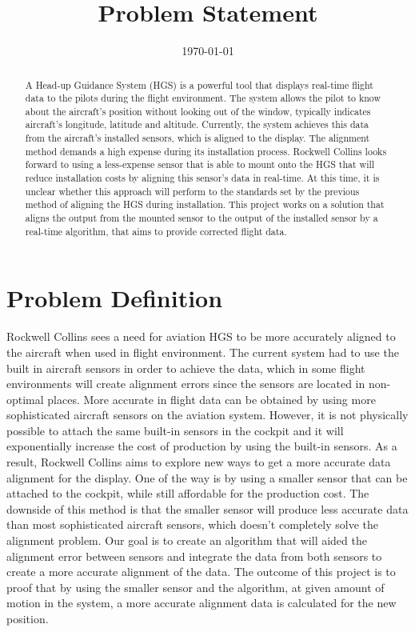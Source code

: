 \documentclass[letterpaper,10pt,titlepage]{article}
\title{\Large{Problem Statement}}
\author{\name}
\date{\today}
\begin{document}
\maketitle


\begin{abstract}
A Head-up Guidance System (HGS) is a powerful tool that displays real-time flight data to the pilots during the flight environment. The system allows the pilot to know about the aircraft’s position without looking out of the window, typically indicates aircraft’s longitude, latitude and altitude. Currently, the system achieves this data from the aircraft’s installed sensors, which is aligned to the display. The alignment method demands a high expense during its installation process. Rockwell Collins looks forward to using a less-expense sensor that is able to mount onto the HGS that will reduce installation costs by aligning this sensor’s data in real-time. At this time, it is unclear whether this approach will perform to the standards set by the previous method of aligning the HGS during installation. This project works on a solution that aligns the output from the mounted sensor to the output of the installed sensor by a real-time algorithm, that aims to provide corrected flight data. 

\end{abstract}

\section*{Problem Definition}
Rockwell Collins sees a need for aviation HGS to be more accurately aligned to the aircraft when used in flight environment. The current system had to use the built in aircraft sensors in order to achieve the data, which in some flight environments will create alignment errors since the sensors are located in non-optimal places. More accurate in flight data can be obtained by using more sophisticated aircraft sensors on the aviation system. However, it is not physically possible to attach the same built-in sensors in the cockpit and it will exponentially increase the cost of production by using the built-in sensors. As a result, Rockwell Collins aims to explore new ways to get a more accurate data alignment for the display. One of the way is by using a smaller sensor that can be attached to the cockpit, while still affordable for the production cost. The downside of this method is that the smaller sensor will produce less accurate data than most sophisticated aircraft sensors, which doesn’t completely solve the alignment problem. Our goal is to create an algorithm that will aided the alignment error between sensors and integrate the data from both sensors to create a more accurate alignment of the data. The outcome of this project is to proof that by using the smaller sensor and the algorithm, at given amount of motion in the system, a more accurate alignment data is calculated for the new position.
\end{document}
